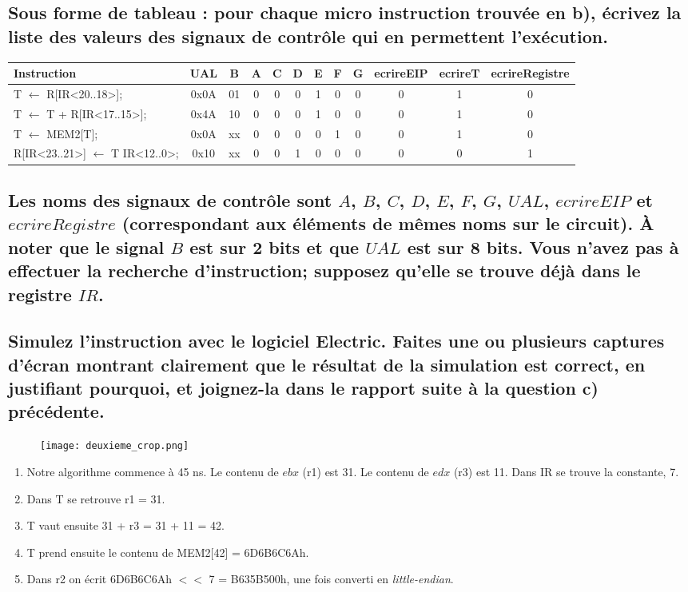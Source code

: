 \documentclass[10pt,letterpaper]{article}
\begin{document}
\subsection{Sous forme de tableau : pour chaque micro instruction trouvée en b), écrivez la liste des valeurs des signaux de contrôle qui en permettent l'exécution.}
\begin{tabular}{| l | c c | c c c c c c c c c |}
\hline
Instruction & UAL & B & A & C & D & E & F & G & ecrireEIP & ecrireT & ecrireRegistre \\
\hline
T $\gets$ R[IR<20..18>]; & 0x0A & 01 & 0 & 0 & 0 & 1 & 0 & 0 & 0 & 1 & 0 \\
T $\gets$ T + R[IR<17..15>]; & 0x4A & 10 & 0 & 0 & 0 & 1 & 0 & 0 & 0 & 1 & 0 \\
T $\gets$ MEM2[T]; & 0x0A & xx & 0 & 0 & 0 & 0 & 1 & 0 & 0 & 1 & 0 \\
R[IR<23..21>] $\gets$ T \text{<}\text{<} IR<12..0>; & 0x10 & xx & 0 & 0 & 1 & 0 & 0 & 0 & 0 & 0 & 1 \\
\hline
\end{tabular}
\medskip

\subsection{Les noms des signaux de contrôle sont $A$, $B$, $C$, $D$, $E$, $F$, $G$, $UAL$, $ecrireEIP$ et $ecrireRegistre$ (correspondant aux éléments de mêmes noms sur le circuit). À noter que le signal $B$ est sur 2 bits et que $UAL$ est sur 8 bits. Vous n'avez pas à effectuer la recherche d'instruction; supposez qu'elle se trouve déjà dans le registre $IR$.}
\medskip

\subsection{Simulez l'instruction avec le logiciel Electric. Faites une ou plusieurs captures d'écran montrant clairement que le résultat de la simulation est correct, en justifiant pourquoi, et joignez-la dans le rapport suite à la question c) précédente.}
\begin{figure}[h]
\centering
\texttt{[image: deuxieme\_crop.png]}
\end{figure}
\begin{enumerate}
\item Notre algorithme commence à 45 ns. Le contenu de $ebx$ (r1) est 31. Le contenu de $edx$ (r3) est 11. Dans IR se trouve la constante, 7.
\item Dans T se retrouve r1 = 31.
\item T vaut ensuite 31 + r3 = 31 + 11 = 42.
\item T prend ensuite le contenu de MEM2[42] = 6D6B6C6Ah.
\item Dans r2 on écrit 6D6B6C6Ah $<<$ 7 = B635B500h, une fois converti en \textit{little-endian}.
\end{enumerate}
\end{document}
